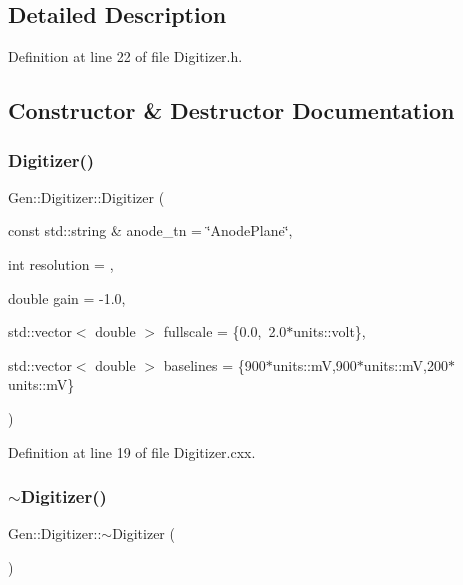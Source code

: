 \subsection{Detailed Description}


Definition at line 22 of file Digitizer.\+h.



\subsection{Constructor \& Destructor Documentation}
\mbox{\label{class_wire_cell_1_1_gen_1_1_digitizer_aee4cf08d87691932751e7eb8a5a9559d}} 
\subsubsection{\texorpdfstring{Digitizer()}{Digitizer()}}
{\footnotesize\ttfamily Gen\+::\+Digitizer\+::\+Digitizer (\begin{DoxyParamCaption}\item[{const std\+::string \&}]{anode\+\_\+tn = {\ttfamily \char`\"{}AnodePlane\char`\"{}},  }\item[{int}]{resolution = {},  }\item[{double}]{gain = {\ttfamily -\/1.0},  }\item[{std\+::vector$<$ double $>$}]{fullscale = {\ttfamily \{0.0,~2.0$\ast$units\+:\+:volt\}},  }\item[{std\+::vector$<$ double $>$}]{baselines = {\ttfamily \{900$\ast$units\+:\+:mV,900$\ast$units\+:\+:mV,200$\ast$units\+:\+:mV\}} }\end{DoxyParamCaption})}



Definition at line 19 of file Digitizer.\+cxx.

\mbox{\label{class_wire_cell_1_1_gen_1_1_digitizer_a2f927b1818c23d7719b1ad4ec5d76a3e}} 
\subsubsection{\texorpdfstring{$\sim$\+Digitizer()}{~Digitizer()}}
{\footnotesize\ttfamily Gen\+::\+Digitizer\+::$\sim$\+Digitizer (\begin{DoxyParamCaption}{ }\end{DoxyParamCaption})\hspace{0.3cm}{\ttfamily [virtual]}}



